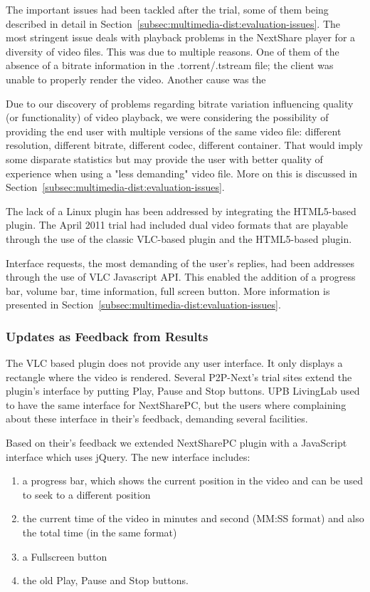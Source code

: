 The important issues had been tackled after the trial, some of them being
described in detail in Section~\ref{subsec:multimedia-dist:evaluation-issues}. The most stringent issue deals with
playback problems in the NextShare player for a diversity of video files. This
was due to multiple reasons. One of them of the absence of a bitrate
information in the .torrent/.tstream file; the client was unable to properly
render the video. Another cause was the 

Due to our discovery of problems regarding bitrate variation influencing
quality (or functionality) of video playback, we were considering the
possibility of providing the end user with multiple versions of the same video
file: different resolution, different bitrate, different codec, different
container. That would imply some disparate statistics but may provide the user
with better quality of experience when using a "less demanding" video file.
More on this is discussed in Section~\ref{subsec:multimedia-dist:evaluation-issues}.

The lack of a Linux plugin has been addressed by integrating the HTML5-based
plugin. The April 2011 trial had included
dual video formats that are playable through the use of the classic VLC-based
plugin and the HTML5-based plugin.

Interface requests, the most demanding of the user's replies, had been
addresses through the use of VLC Javascript API. This enabled the addition of
a progress bar, volume bar, time information, full screen button. More
information is presented in Section~\ref{subsec:multimedia-dist:evaluation-issues}.

\subsubsection{Updates as Feedback from Results}

The VLC based plugin does not provide any user interface. It only displays a
rectangle where the video is rendered. Several P2P-Next's trial sites extend
the plugin's interface by putting Play, Pause and Stop buttons. UPB LivingLab
used to have the same interface for NextSharePC, but the users where
complaining about these interface in their's feedback, demanding several
facilities.

Based on their's feedback we extended NextSharePC plugin with a JavaScript
interface which uses jQuery. The new interface includes:
\begin{enumerate}
  \item a progress bar, which shows the current position in the video and can
  be used to seek to a different position
  \item the current time of the video in minutes and second (MM:SS format) and
  also the total time (in the same format)
  \item a Fullscreen button
  \item the old Play, Pause and Stop buttons.
\end{enumerate}


